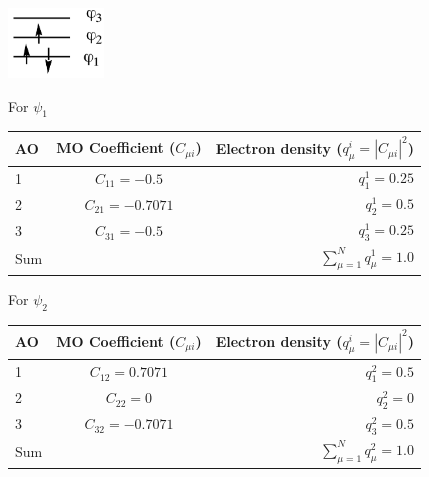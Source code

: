 \documentclass[../Main/chem532-notes.tex]{subfiles}
\begin{document}
\begin{example}

\begin{center}
\includegraphics[width=1in]{../huckel/c2_allyl_ediagram.png}
\end{center}

For $\psi_1$
\begin{center}
\begin{tabular}{@{} lcr @{}} %
\toprule
AO & MO Coefficient ($C_{\mu i}$) & Electron density ($q^i_\mu = |C_{\mu i}|^2$)\\
\midrule
1 & $C_{11} = -0.5$ & $q_{1}^{1} = 0.25$ \\
2 & $C_{21} = -0.7071$ & $q_{2}^{1} = 0.5$ \\
3 & $C_{31} = -0.5$ & $q_{3}^{1} = 0.25$ \\
\midrule
Sum & & $\displaystyle \sum_{\mu = 1}^{N} q^1_\mu = 1.0$ \\
\bottomrule
\end{tabular}
\end{center}

For $\psi_2$
\begin{center}
\begin{tabular}{@{} lcr @{}} %
\toprule
AO & MO Coefficient ($C_{\mu i}$) & Electron density ($q^i_\mu = |C_{\mu i}|^2$)\\
\midrule
1 & $C_{12} = 0.7071$ & $q_{1}^{2} = 0.5$ \\
2 & $C_{22} = 0$ & $q_{2}^{2} = 0$ \\
3 & $C_{32} = -0.7071$ & $q_{3}^{2} = 0.5$ \\
\midrule
Sum & & $\displaystyle \sum_{\mu = 1}^{N} q^2_\mu = 1.0$ \\
\bottomrule
\end{tabular}
\end{center}
\end{example}
\end{document}
